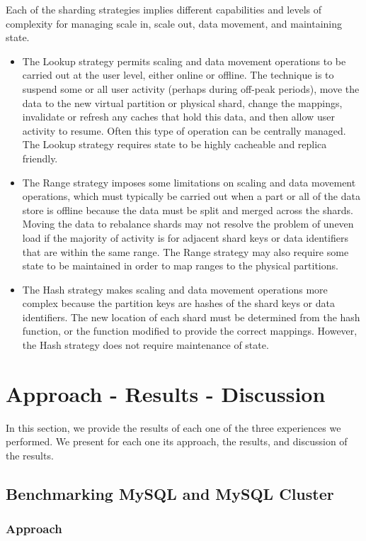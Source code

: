 \documentclass[10pt, conference]{IEEEtran}
\begin{document}
\indent Each of the sharding strategies implies different capabilities and levels of complexity for managing scale in, scale out, data movement, and maintaining state.
\begin{itemize}
\item The Lookup strategy permits scaling and data movement operations to be carried out at the user level, either online or offline. The technique is to suspend some or all user activity (perhaps during off-peak periods), move the data to the new virtual partition or physical shard, change the mappings, invalidate or refresh any caches that hold this data, and then allow user activity to resume. Often this type of operation can be centrally managed. The Lookup strategy requires state to be highly cacheable and replica friendly.
\item The Range strategy imposes some limitations on scaling and data movement operations, which must typically be carried out when a part or all of the data store is offline because the data must be split and merged across the shards. Moving the data to rebalance shards may not resolve the problem of uneven load if the majority of activity is for adjacent shard keys or data identifiers that are within the same range. The Range strategy may also require some state to be maintained in order to map ranges to the physical partitions.
\item The Hash strategy makes scaling and data movement operations more complex because the partition keys are hashes of the shard keys or data identifiers. The new location of each shard must be determined from the hash function, or the function modified to provide the correct mappings. However, the Hash strategy does not require maintenance of state.
\end{itemize}

\section{Approach - Results - Discussion}

In this section, we provide the results of each one of the three experiences we performed. We present for each one its approach, the results, and discussion of the results.

\subsection{Benchmarking MySQL and MySQL Cluster}

\subsubsection{Approach} 
\end{document}
